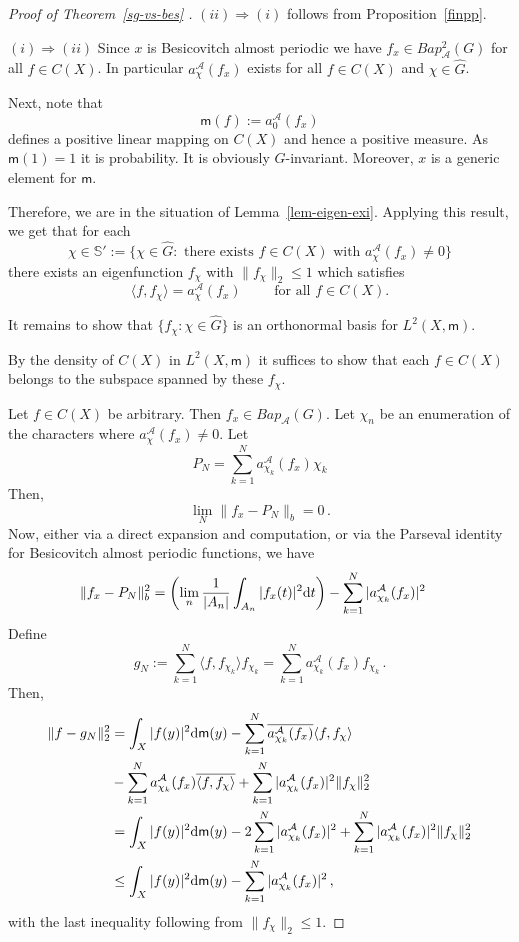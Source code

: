 \documentclass [14pt]{amsart}
\numberwithin{equation}{section}
\newcommand{\cA}{{\mathcal A}}
\newcommand{\mm}{\mathsf{m}}
\newcommand{\dd}{\mbox{\rm d}}
\newcommand{\bap}{Bap}
\newcommand{\SSS}{\mathbb S}
\begin{document}
\begin{proof}[Proof of Theorem~\ref{sg-vs-bes} ]
$(ii)\Longrightarrow(i)$ follows from Proposition~\ref{finpp}.

\smallskip

$(i)\Longrightarrow(ii)$ Since $x$ is Besicovitch almost periodic we have $f_x \in Bap^2_{\cA}(G)$ for all $f \in C(X)$. In particular
$a_{\chi}^\cA(f_x)$ exists for all $f \in C(X)$ and $\chi \in \widehat{G}$.


Next, note that
\[
\mm(f):= a_0^\cA(f_x)
\]
defines a positive linear mapping on $C(X)$ and hence a positive measure. As $\mm(1)=1$ it is probability. It is obviously $G$-invariant. Moreover, $x$ is a generic element for $\mm$.

Therefore, we are in the situation of Lemma~\ref{lem-eigen-exi}. Applying this result, we get that for each
\[
\chi \in \SSS':= \{ \chi \in \widehat{G} : \mbox{ there exists }  f \in C(X) \mbox{ with } a_\chi^\cA(f_x) \neq 0 \}
\]
there exists an eigenfunction $f_\chi$ with $\| f_ \chi \|_2 \leq 1$ which satisfies
$$\langle f, f_\chi \rangle =a_\chi^\cA(f_x) \qquad \mbox{ for all } f \in C(X).$$

It remains to show  that $\{ f_\chi : \chi \in \widehat{G} \}$ is an orthonormal basis for $L^2(X, \mm)$.

By the density of $C(X)$ in $L^2(X,\mm)$ it suffices to show that each $f \in C(X)$ belongs to the subspace spanned by these $f_\chi$.

Let $f \in C(X)$ be arbitrary. Then $f_x \in \bap_{\cA}(G)$. Let $\chi_n$ be an enumeration of the characters where $a_{\chi}^\cA(f_x) \neq 0$.
Let
\[
P_N= \sum_{k=1}^N a_{\chi_k}^\cA(f_x) \chi_k
\]
Then,
\[
\lim_N \| f_x-P_N \|_{b} =0 \,.
\]
Now, either via a direct expansion and computation, or via the Parseval identity for Besicovitch almost periodic functions, we have
\begin{align*}
 \| f_x-P_N \|^2_{b}&= \left( \lim_n \frac{1}{|A_n|} \int_{A_n} |f_x(t)|^2 \dd t \right) - \sum_{k=1}^N |a_{\chi_k}^\cA(f_x)|^2
\end{align*}
Define
\[
g_N:= \sum_{k=1}^N \langle f, f_{\chi_k} \rangle f_{\chi_k}= \sum_{k=1}^N a_{\chi_k}^\cA(f_x) f_{\chi_k}\,.
\]
Then,
\begin{align*}
 \| f-g_N \|_{2}^2&= \int_{X} |f(y)|^2 \dd \mm(y) - \sum_{k=1}^N \overline{a_{\chi_k}^\cA(f_x)} \langle f, f_\chi \rangle \\
 &-\sum_{k=1}^N a_{\chi_k}^\cA(f_x)\overline{ \langle f, f_\chi \rangle} + \sum_{k=1}^N |a_{\chi_k}^\cA(f_x)|^2 \| f_\chi \|^2_2 \\
 &= \int_{X} |f(y)|^2 \dd \mm(y) - 2 \sum_{k=1}^N |a_{\chi_k}^\cA(f_x)|^2 + \sum_{k=1}^N |a_{\chi_k}^\cA(f_x)|^2 \| f_\chi \|^2_2 \\
 &\leq \int_{X} |f(y)|^2 \dd \mm(y) -  \sum_{k=1}^N |a_{\chi_k}^\cA(f_x)|^2 \,,
\end{align*}
with the last inequality following from $\|f_\chi \|_2 \leq 1$.


\end{proof}
\end{document}

